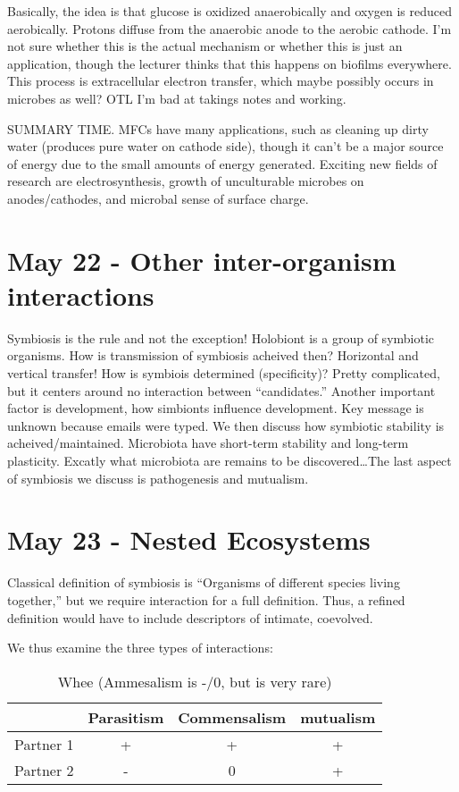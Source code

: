 \documentclass[12pt]{article}
\begin{document}
Basically, the idea is that glucose is oxidized anaerobically and oxygen is reduced aerobically. Protons diffuse from the anaerobic anode to the aerobic cathode. I'm not sure whether this is the actual mechanism or whether this is just an application, though the lecturer thinks that this happens on biofilms everywhere. This process is extracellular electron transfer, which maybe possibly occurs in microbes as well? OTL I'm bad at takings notes and working.

SUMMARY TIME. MFCs have many applications, such as cleaning up dirty water (produces pure water on cathode side), though it can't be a major source of energy due to the small amounts of energy generated. Exciting new fields of research are electrosynthesis, growth of unculturable microbes on anodes/cathodes, and microbal sense of surface charge.
\section*{May 22 - Other inter-organism interactions}

Symbiosis is the rule and not the exception! Holobiont is a group of symbiotic organisms. How is transmission of symbiosis acheived then? Horizontal and vertical transfer! How is symbiois determined (specificity)? Pretty complicated, but it centers around no interaction between ``candidates.'' Another important factor is development, how simbionts influence development. Key message is unknown because emails were typed. We then discuss how symbiotic stability is acheived/maintained. Microbiota have short-term stability and long-term plasticity. Excatly what microbiota are remains to be discovered\dots The last aspect of symbiosis we discuss is pathogenesis and mutualism.
\section*{May 23 - Nested Ecosystems}

Classical definition of symbiosis is ``Organisms of different species living together,'' but we require interaction for a full definition. Thus, a refined definition would have to include descriptors of intimate, coevolved.

We thus examine the three types of interactions:
\begin{table}
	\centering
	\begin{tabular}{|c|c|c|c|}
		\hline
		&Parasitism & Commensalism & mutualism\\\hline
		Partner 1 & + & + & +\\\hline
		Partner 2 & - & 0 & +\\\hline
	\end{tabular}
	\caption{Whee (Ammesalism is -/0, but is very rare)}
\end{table}
\end{document}
